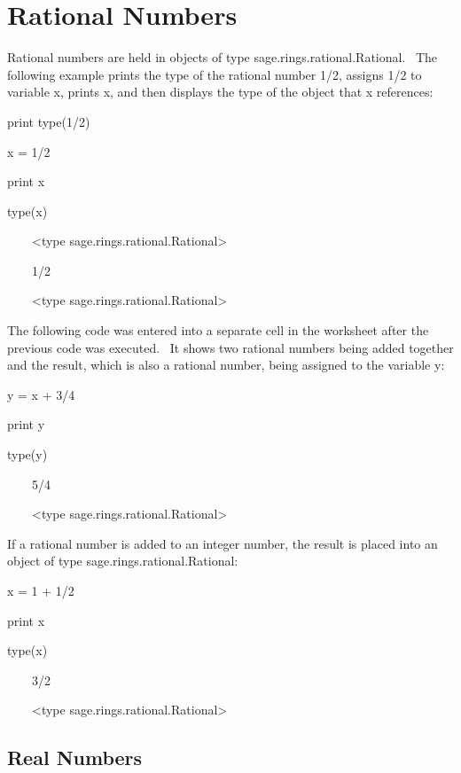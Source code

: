 \documentclass[12pt,twoside]{book}
\begin{document}
\section[Rational Numbers]{Rational Numbers}
Rational numbers are held in objects of type
sage.rings.rational.Rational. \ The following example prints the type
of the rational number 1/2, assigns 1/2 to variable x, prints x, and
then displays the type of the object that x references:

print type(1/2)

x = 1/2

print x

type(x)

{\textbar}

\ \ \ \ {\textless}type
{\textquotesingle}sage.rings.rational.Rational{\textquotesingle}{\textgreater}

\ \ \ \ 1/2

\ \ \ \ {\textless}type
{\textquotesingle}sage.rings.rational.Rational{\textquotesingle}{\textgreater}


\bigskip

The following code was entered into a separate cell in the worksheet
after the previous code was executed. \ It shows two rational numbers
being added together and the result, which is also a rational number,
being assigned to the variable y:

y = x + 3/4

print y

type(y)

{\textbar}

\ \ \ \ 5/4

\ \ \ \ {\textless}type
{\textquotesingle}sage.rings.rational.Rational{\textquotesingle}{\textgreater}

If a rational number is added to an integer number, the result is placed
into an object of type sage.rings.rational.Rational:


\bigskip

x = 1 + 1/2

print x

type(x)

{\textbar}

\ \ \ \ 3/2

\ \ \ \ {\textless}type
{\textquotesingle}sage.rings.rational.Rational{\textquotesingle}{\textgreater}

\subsection[Real Numbers]{Real Numbers}
\end{document}
